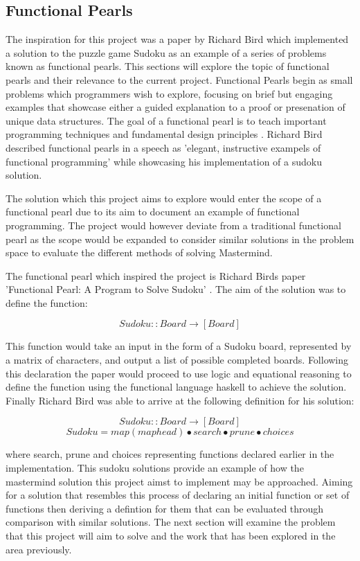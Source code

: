 \documentclass[12pt]{article}  %
\theoremstyle{definition}
\theoremstyle{remark}
\begin{document}
\subsection {Functional Pearls}
The inspiration for this project was a paper by Richard Bird which implemented a solution to the puzzle game Sudoku as an example of a series of problems known as functional pearls. This sections will explore the topic of functional pearls and their relevance to the current project. Functional Pearls begin as small problems which programmers wish to explore, focusing on brief but engaging examples that showcase either a guided explanation to a proof or presenation of unique data structures. The goal of a functional pearl is to teach important programming techniques and fundamental design principles \cite{Pearls}.  Richard Bird described functional pearls in a speech as 'elegant, instructive exampels of functional programming' while showcasing his implementation of a sudoku solution\cite {R. Bird Speech}.

The solution which this project aims to explore would enter the scope of a functional pearl due to its aim to document an example of functional programming. The project would however deviate from a traditional functional pearl as the scope would be expanded to consider similar solutions in the problem space to evaluate the different methods of solving Mastermind.

The functional pearl which inspired the project is Richard Birds paper 'Functional Pearl: A Program to Solve Sudoku' \cite{Sudoku}. The aim of the solution was to define the function:

\[ Sudoku :: Board \rightarrow [Board]\]

This function would take an input in the form of a Sudoku board, represented by a matrix of characters, and output a list of possible completed boards. Following this declaration the paper would proceed to use logic and equational reasoning to define the function using the functional language haskell to achieve the solution. Finally Richard Bird was able to arrive at the following definition for his solution:

\[ Sudoku :: Board \rightarrow [Board]\]
\[ Sudoku = map (map head) \bullet search \bullet prune \bullet choices\]

where search, prune and choices representing functions declared earlier in the implementation. This sudoku solutions provide an example of how the mastermind solution this project aimst to implement may be approached. Aiming for a solution that resembles this process of declaring an initial function or set of functions then deriving a defintion for them that can be evaluated through comparison with similar solutions. The next section will examine the problem that this project will aim to solve and the work that has been explored in the area previously.
\end{document}
